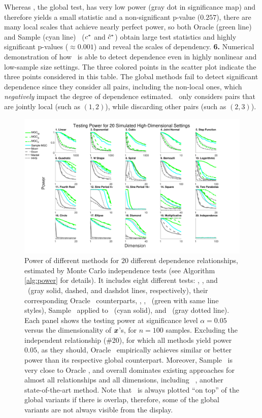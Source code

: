 \documentclass[11pt]{extarticle}
\begin{document}
{Whereas \Mcorr, the global test, has very low power (gray dot in  significance map)
and therefore yields a small statistic and a non-significant p-value ($0.257$),  there are many local scales that achieve nearly perfect power, so both Oracle (green line) and Sample (cyan line) \Mgc~($c^{*}$ and $\hat{c}^{*}$) obtain large test statistics and highly significant p-values ($\approx 0.001$) and reveal the scales of dependency.
\textbf{6.} Numerical demonstration of how \Mgc~is able to detect dependence even in highly nonlinear and low-sample size settings. The three colored points in the scatter plot indicate the three points considered in this table.
The global methods fail to detect significant dependence since they consider all pairs, including the non-local ones, which \emph{negatively} impact the degree of dependence estimated.
\Mgc~only considers pairs that are jointly local (such as $(1,2)$), while discarding other pairs (such as $(2,3)$).
}
\label{f:schematic}


\begin{figure}[htbp]
\includegraphics[width=1.0\textwidth,trim={0 0.5cm 3.2cm 0},clip]{Figures/FigHDPowerAll}
\caption{Power of different methods for $20$ different dependence relationships, estimated by Monte Carlo independence tests (see Algorithm \ref{alg:power} for details). It includes eight different tests: \Mcorr, \Dcorr, and \Mantel~(gray solid, dashed, and dashdot lines, respectively), their corresponding Oracle \Mgc~counterparts, \Mgcm, \Mgcd, \Mgcp~(green with same line styles), Sample \Mgc~applied to \Mcorr~(cyan solid), and \Hhg~(gray dotted line).
Each panel shows the testing power at significance level $\alpha=0.05$ versus the dimensionality of $\boldsymbol{x}$'s, for $n=100$ samples.
Excluding the independent relationship (\#20), for which all methods yield power $0.05$, as they should, Oracle \Mgc~empirically achieves similar or better power than its respective global counterpart. Moreover, Sample \Mgc~is very close to Oracle \Mgcm, and overall dominates existing approaches for almost all relationships and all dimensions, including \Hhg~\cite{HellerGorfine2013}, another state-of-the-art method. Note that \Mgc~is always plotted ``on top'' of the global variants if there is overlap, therefore, some of the global variants are not always visible from the display.}
\label{f:nDAll}
\end{figure}
\end{document}
